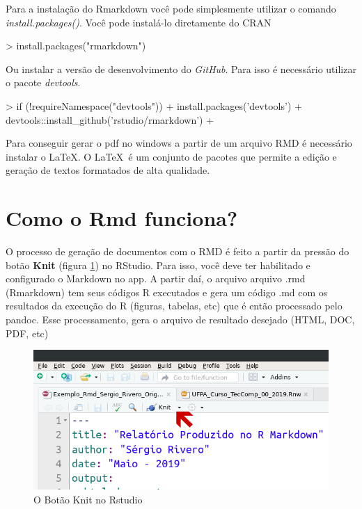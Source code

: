 \documentclass[12pt,a4paper,oneside]{erdc}
\begin{document}
	Para a instalação do Rmarkdown você pode simplesmente utilizar o comando \textit{install.packages()}. Você pode instalá-lo diretamente do CRAN
		
\begin{Schunk}
\begin{Sinput}
> install.packages("rmarkdown")
\end{Sinput}
\end{Schunk}
	
	Ou instalar a versão de desenvolvimento do \textit{GitHub}. Para isso é necessário utilizar o pacote \textit{devtools}.
	
\begin{Schunk}
\begin{Sinput}
> if (!requireNamespace("devtools")){
+ 	install.packages('devtools')
+ 	devtools::install_github('rstudio/rmarkdown')
+ 	}
\end{Sinput}
\end{Schunk}

	Para conseguir gerar o pdf no windows a partir de um arquivo RMD é necessário instalar o \LaTeX. O \LaTeX ~é um conjunto de pacotes que permite a edição e geração de textos formatados de alta qualidade.
	


	\section{Como o Rmd funciona?}
		
	O processo de geração de documentos com o RMD é feito a partir da pressão do botão \textbf{Knit} (figura \ref{fig:bpcursoteccomp002019f04-02}) no RStudio. Para isso, você deve ter habilitado e configurado o Markdown no app.  A partir daí, o arquivo arquivo .rmd (Rmarkdown) tem seus códigos R executados e gera um código .md com os resultados da execução do R (figuras, tabelas, etc) que  é então processado pelo pandoc. Esse processamento, gera o arquivo de resultado desejado (HTML, DOC, PDF, etc)

	\begin{figure}
		\centering
		\includegraphics[width=0.7\linewidth]{../figs/BP_Curso_TecComp_00_2019_f04-02}
		\caption{O Botão Knit no Rstudio}
		\label{fig:bpcursoteccomp002019f04-02}
	\end{figure}
	
\end{document}
